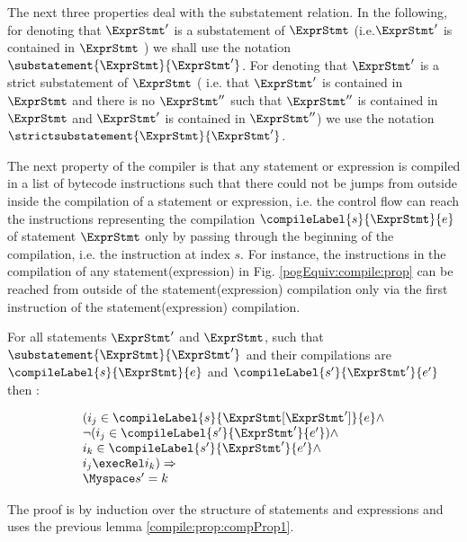  
The next three properties deal with the substatement relation. 
In the following, for denoting that  $\ExprStmt'$ is a substatement of  $\ExprStmt$ (i.e.$\ExprStmt'$ is contained in  $\ExprStmt$  )
we shall use the notation $\substatement{\ExprStmt }{\ExprStmt'}$.
For denoting that  $\ExprStmt'$ is a strict substatement of  $\ExprStmt$ ( i.e. that $\ExprStmt'$  is contained in $\ExprStmt$ 
and there is no   $\ExprStmt''$  such that  $\ExprStmt''$ is contained in   $\ExprStmt$ and  $\ExprStmt'$ is contained in  $\ExprStmt''$)
we use the notation $\strictsubstatement{\ExprStmt }{\ExprStmt'}$.

The next  property  of the compiler is that any statement or expression   is
 compiled in a list of bytecode instructions 
such that there could not be jumps  from outside inside the compilation of a statement or expression, i.e.
the control flow can reach the instructions representing the compilation $\compileLabel{s}{\ExprStmt}{e}$ 
 of statement $\ExprStmt$  only by passing   through the beginning of the compilation, i.e. the instruction at index $s$. 
For instance, the instructions in the compilation of any statement(expression) in Fig. \ref{pogEquiv:compile:prop}
 can be reached from outside of the statement(expression) compilation only via the first instruction of the statement(expression) compilation.

\begin{compProp2}\label{compile:prop:compProp2}
 For all  statements $\ExprStmt'$  and $\ExprStmt$, such that $\substatement{\ExprStmt }{\ExprStmt'} $
and their  compilations  are $\compileLabel{s}{\ExprStmt}{e}$ and  $\compileLabel{s'}{\ExprStmt'}{e'}$  then :




$$\begin{array}{l} %
                        (  i_j \in \compileLabel{s}{\ExprStmt[\ExprStmt']}{e} \wedge\\
		        \neg (i_j \in \compileLabel{s'}{\ExprStmt'}{e'} )   \wedge \\
		        i_k \in \compileLabel{s'}{\ExprStmt'}{e'}  \wedge \\
		        
		       i_j \execRel i_k )  \Rightarrow \\ 
		       \Myspace  s' = k 


  \end{array}$$ 

\end{compProp2}
The proof is by induction over the structure of statements and expressions  and uses the previous lemma \ref{compile:prop:compProp1}.


